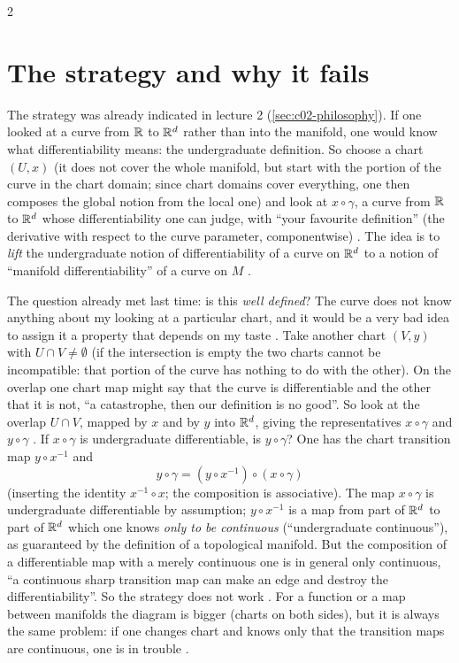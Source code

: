 \begin{paracol}{2}
\section{The strategy and why it fails}\label{sec:c04-strategy}

The strategy was already indicated in lecture 2 (\cref{sec:c02-philosophy}). If one looked at a curve from $\mathbb{R}$ to $\mathbb{R}^d$ rather than into the manifold, one would know what differentiability means: the undergraduate definition. So choose a chart $(U,x)$ (it does not cover the whole manifold, but start with the
portion of the curve in the chart domain; since chart domains cover everything, one then composes the global notion from the local one) and look at $x\circ\gamma$, a curve from $\mathbb{R}$ to $\mathbb{R}^d$ whose differentiability one can judge, with ``your favourite definition'' (the derivative with respect to the curve parameter, componentwise)
. The idea is to \emph{lift} the undergraduate notion of differentiability of a curve on $\mathbb{R}^d$ to a notion of ``manifold differentiability'' of a curve on $M$ .

The question already met last time: is this \emph{well defined}? The curve does not know anything about my looking at a particular chart, and it would be a very bad idea to assign it a property that depends on my taste .
Take another chart $(V,y)$ with $U\cap V\neq\emptyset$ (if the intersection is empty the two charts cannot be incompatible: that portion of the curve has nothing to do with the other). On the overlap one chart map might say that the curve is differentiable and the other that it is not, ``a catastrophe, then our definition is no good''.
So look at the overlap $U\cap V$, mapped by $x$ and by $y$ into $\mathbb{R}^d$, giving the representatives $x\circ\gamma$ and $y\circ\gamma$ .
If $x\circ\gamma$ is undergraduate differentiable, is $y\circ\gamma$? One has the chart transition map $y\circ x^{-1}$ and
\[
  y\circ\gamma=(y\circ x^{-1})\circ(x\circ\gamma)
\]
(inserting the identity $x^{-1}\circ x$; the composition is associative). The map $x\circ\gamma$ is undergraduate differentiable by assumption; $y\circ x^{-1}$ is a map from part of $\mathbb{R}^d$ to part of $\mathbb{R}^d$ which one knows \emph{only to be continuous} (``undergraduate continuous''), as guaranteed by the definition of a topological manifold.
But the composition of a differentiable map with a merely continuous one is in general only continuous, ``a continuous sharp transition map can make an edge and destroy the differentiability''. So the strategy does not work
.
For a function or a map between manifolds the diagram is bigger (charts on both sides), but it is always the same problem: if one changes chart and knows only that the transition maps are continuous, one is in trouble .


\end{paracol}
